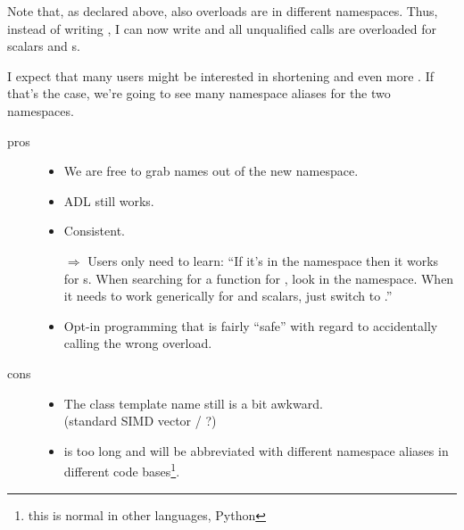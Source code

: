 Note that, as declared above, also  overloads are in different
namespaces.
Thus, instead of writing , I can now write  and all unqualified  calls are overloaded
for scalars and s.

I expect that many users might be interested in shortening \std{} and
even more \std{}.
If that's the case, we're going to see many namespace aliases for the two
namespaces.

\begin{description}
  \item[pros]
    \begin{itemize}
      \item We are free to grab names out of the new namespace.
      \item ADL still works.
      \item Consistent.
      \item[$\Rightarrow$] Users only need to learn: “If it's in the
        \std{} namespace then it works for s.
        When searching for a function for , look in the
        \std{} namespace.
        When it needs to work generically for  and scalars, just
        switch to \std{}.”
      \item Opt-in \simdgeneric programming that is fairly “safe” with regard
        to accidentally calling the wrong overload.
    \end{itemize}

  \item[cons]
    \begin{itemize}
      \item The class template name \std{} still is a bit
        awkward.
        \\(standard SIMD vector / \std{}?)
      \item \std{} is too long and will be abbreviated with
        different namespace aliases in different code bases\footnote{this is
        normal in other languages, \eg Python}.
    \end{itemize}
\end{description}

